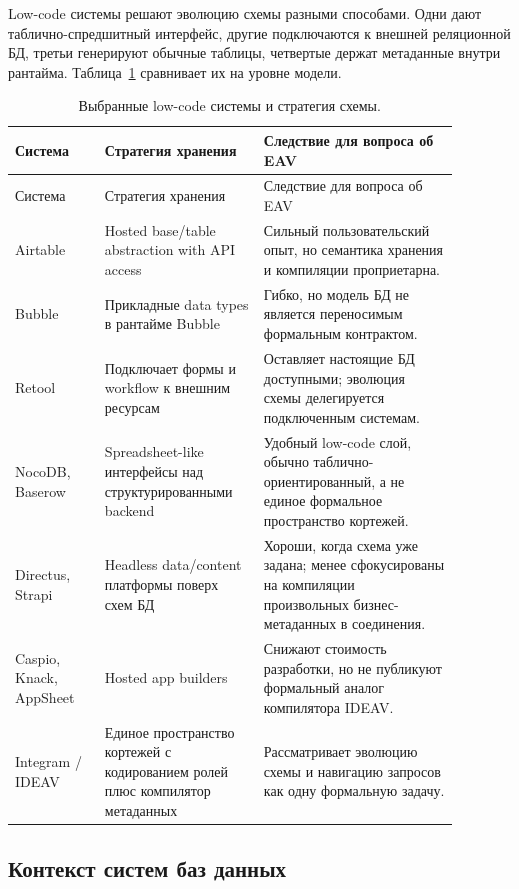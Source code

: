 \documentclass[11pt]{article}
\begin{document}
Low-code системы решают эволюцию схемы разными способами. Одни дают
таблично-спредшитный интерфейс, другие подключаются к внешней реляционной БД,
третьи генерируют обычные таблицы, четвертые держат метаданные внутри рантайма.
Таблица~\ref{tab:lowcode-ru} сравнивает их на уровне модели.

\begin{longtable}{p{0.18\linewidth}p{0.31\linewidth}p{0.39\linewidth}}
\caption{Выбранные low-code системы и стратегия схемы.}\label{tab:lowcode-ru}\\
\toprule
Система & Стратегия хранения & Следствие для вопроса об EAV \\
\midrule
\endfirsthead
\toprule
Система & Стратегия хранения & Следствие для вопроса об EAV \\
\midrule
\endhead
Airtable & Hosted base/table abstraction with API access \citep{airtableApi} &
Сильный пользовательский опыт, но семантика хранения и компиляции проприетарна. \\
Bubble & Прикладные data types в рантайме Bubble \citep{bubbleData} &
Гибко, но модель БД не является переносимым формальным контрактом. \\
Retool & Подключает формы и workflow к внешним ресурсам
\citep{retoolResources} & Оставляет настоящие БД доступными; эволюция схемы
делегируется подключенным системам. \\
NocoDB, Baserow & Spreadsheet-like интерфейсы над структурированными backend
\citep{nocodb,baserow} & Удобный low-code слой, обычно таблично-ориентированный,
а не единое формальное пространство кортежей. \\
Directus, Strapi & Headless data/content платформы поверх схем БД
\citep{directus,strapi} & Хороши, когда схема уже задана; менее сфокусированы на
компиляции произвольных бизнес-метаданных в соединения. \\
Caspio, Knack, AppSheet & Hosted app builders \citep{caspio,knack,appsheet} &
Снижают стоимость разработки, но не публикуют формальный аналог компилятора
IDEAV. \\
Integram / IDEAV & Единое пространство кортежей с кодированием ролей плюс
компилятор метаданных \citep{integramWorkflow2026,integramMcp2026} &
Рассматривает эволюцию схемы и навигацию запросов как одну формальную задачу. \\
\bottomrule
\end{longtable}

\subsection{Контекст систем баз данных}
\end{document}
